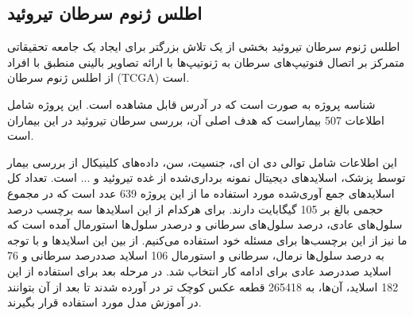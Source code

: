 \subsection{اطلس ژنوم سرطان تیروئید}\label{subsec:موسسه-ملی-سرطان-پورتال-داده-های-مشترک-ژنومیک}

اطلس ژنوم سرطان تیروئید بخشی از یک تلاش بزرگتر برای ایجاد یک جامعه تحقیقاتی متمرکز بر اتصال فنوتیپ‌های سرطان به ژنوتیپ‌ها با ارائه تصاویر بالینی منطبق با افراد از اطلس ژنوم سرطان (TCGA) است.\cite{clark2013cancer}

شناسه پروژه به صورت  است که در آدرس \cite{ncigdc} قابل مشاهده است. این پروژه شامل اطلاعات 507 بیماراست که هدف اصلی آن، بررسی سرطان تیروئید در این بیماران است.

این اطلاعات شامل توالی دی ان ای، جنسیت، سن، داده‌های کلینیکال از بررسی بیمار توسط پزشک، اسلایدهای دیجیتال نمونه برداری‌شده از غده تیروئید و ... است.
تعداد کل اسلاید‌های جمع آوری‌شده مورد استفاده ما از این پروژه 639 عدد است که در مجموع حجمی بالغ بر 105 گیگابایت دارند. برای هرکدام از این اسلاید‌ها سه برچسب درصد سلول‌های عادی، درصد سلول‌های سرطانی و درصدر سلول‌ها استورمال آمده است که ما نیز از این برچسب‌ها برای مسئله خود استفاده می‌کنیم. از بین این اسلاید‌ها و با توجه به درصد سلول‌ها نرمال، سرطانی و استورمال 106 اسلاید صددرصد سرطانی و 76 اسلاید صددرصد عادی برای ادامه کار انتخاب شد.
در مرحله بعد برای استفاده از این 182 اسلاید، آن‌ها، به 265418 قطعه عکس کوچک تر در آورده شدند تا بعد از آن بتوانند در آموزش مدل مورد استفاده قرار بگیرند.